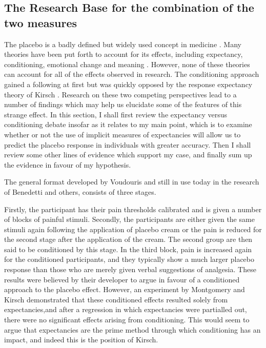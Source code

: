 \subsection{The Research Base for the combination of the two measures}

The placebo is a badly defined but widely used concept in medicine \cite{Kaptchuk1998} . Many theories have been put forth to account for its effects, including expectancy, conditioning, emotional change and meaning \cite{Stewart-Williams2004b}. However, none of these theories can account for all of the effects observed in research. The conditioning approach gained a following at first \cite{Voudouris1985}  but was quickly opposed by the response expectancy theory of Kirsch \cite{Kirsch1985,Kirsch1997}. Research on these two competing perspectives lead to a number of findings which may help us elucidate some of the features of this strange effect. In this section, I shall first review the expectancy versus conditioning debate insofar as it relates to my main point, which is to examine whether or not the use of implicit measures of expectancies will allow us to predict the placebo response in individuals with greater accuracy. Then I shall review some other lines of evidence which support my case, and finally sum up the evidence in favour of my hypothesis.

The general format developed by Voudouris and still in use today in the research of Benedetti \cite{Benedetti2006c} and others, consists of three stages. 

Firstly, the participant has their pain thresholds calibrated and is given a number of blocks of painful stimuli. Secondly, the participants are either given the same stimuli again following the application of placebo cream or the pain is reduced for the second stage after the application of the cream. The second group are then said to be conditioned by this stage. In the third block, pain is increased again for the conditioned participants, and they typically show a much larger placebo response than those who are merely given verbal suggestions of analgesia.  These results were believed by their developer to argue in favour of a conditioned approach to the placebo effect. However, an experiment by Montgomery and Kirsch \cite{Montgomery1997} demonstrated that these conditioned effects resulted solely from expectancies,and after a regression in which expectancies were partialled out, there were no significant effects arising from conditioning. This would seem to argue that expectancies are the prime method through which conditioning has an impact, and indeed this is the position of Kirsch. 

